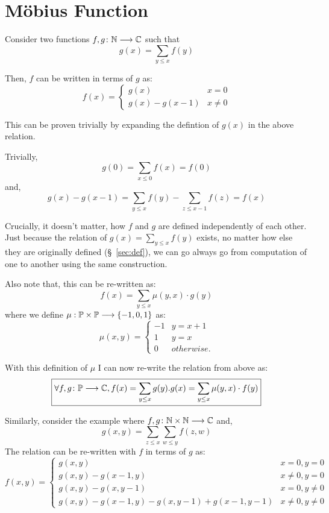 \chapter{M\"obius Function}

Consider two functions $f, g \colon \mathbb{N} \longrightarrow \mathbb{C}$ such that
$$g(x) = \sum\limits_{y \le x} f(y)$$

Then, $f$ can be written in terms of $g$ as:
\[
  f(x) =
  \begin{cases}
    g(x) & x = 0 \\
    g(x) - g(x - 1) & x \neq 0
  \end{cases}
\]

This can be proven trivially by expanding the defintion of $g(x)$ in
the above relation.

Trivially,
$$g(0) = \sum_{x \le 0} f(x) = f(0)$$
and,
$$g(x) - g(x - 1) = \sum_{y \le x} f(y) - \sum_{z \le x - 1} f(z) = f(x)$$

Crucially, it doesn't matter, how $f$ and $g$ are defined
independently of each other.
Just because the relation of $g(x) = \sum\limits_{y \le x} f(y)$ exists,
no matter how else they are originally defined (\S~\ref{sec:def}), we
can go always go from computation of one to another
using the same construction.

Also note that, this can be re-written as:
$$f(x) = \sum_{y \le x} \mu(y, x) \cdot g(y)$$
where we define $\mu : \mathbb{P} \times \mathbb{P} \longrightarrow \{-1, 0, 1\}$ as:
\[
  \mu(x, y) =
  \begin{cases}
    -1 & y = x + 1\\
    1 & y = x\\
    0 & otherwise.
  \end{cases}
\]

With this definition of $\mu$ I can now re-write the relation from above as:
$$\boxed{\forall f, g \colon \mathbb{P} \longrightarrow \mathbb{C}, f(x) =
\sum\limits_{y \le x} g(y). g(x) = \sum\limits_{y \le x} \mu(y, x) \cdot f(y)}$$

Similarly, consider the example where $f, g\colon \mathbb{N} \times \mathbb{N}
\longrightarrow \mathbb{C}$ and,
$$g(x, y) = \sum_{z \le x} \sum_{w \le y} f(z, w)$$
The relation can be re-written with $f$ in terms of $g$ as:
\[
  f(x, y) =
  \begin{cases}
    g(x, y) & x = 0, y = 0 \\
    g(x, y) - g(x - 1, y) & x \neq 0, y = 0\\
    g(x, y) - g(x, y - 1) & x = 0, y \neq 0\\
    g(x, y) - g(x - 1, y) - g(x, y - 1) + g(x - 1, y - 1) & x \neq 0, y \neq 0
  \end{cases}
\]

